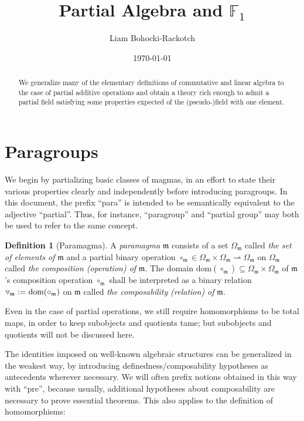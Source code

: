 \documentclass{article}
\title{\huge\bf Partial Algebra and \(\mathbb{F}_1\)}
\author{Liam Bohocki-Rackotch}
\date{\today}
\theoremstyle{definition}
\newtheorem{definition}{Definition}[section]
\newcommand{\tridown}{\mathbin{\hspace{.1em}\raisebox{.02em}{\rotatebox[origin=c]{90}{$\triangleleft$}}}}
\newcommand{\comp}{\tridown}
\newcommand{\pto}{\rightharpoonup}
\begin{document}
\maketitle

\begin{abstract}
We generalize many of the elementary definitions of commutative and linear algebra to the case of partial additive operations and obtain a theory rich enough to admit a partial field satisfying some properties expected of the (pseudo-)field with one element.
\end{abstract}

\tableofcontents

\section{Paragroups}

We begin by partializing basic classes of magmas, in an effort to state their various properties clearly and independently before introducing paragroups. In this document, the prefix ``para'' is intended to be semantically equivalent to the adjective ``partial''. Thus, for instance, ``paragroup'' and ``partial group'' may both be used to refer to the same concept.

\begin{definition}[Paramagma]
A \textit{paramagma} \(\mathfrak{m}\) consists of a set \(\Omega_\mathfrak{m}\) called \textit{the set of elements of} \(\mathfrak{m}\) and a partial binary operation \(\circ_\mathfrak{m}\in\Omega_\mathfrak{m}\times\Omega_\mathfrak{m}\pto\Omega_\mathfrak{m}\) on \(\Omega_\mathfrak{m}\) called \textit{the composition (operation) of} \(\mathfrak{m}\). The domain \(\text{dom}(\circ_\mathfrak{m})\subseteq\Omega_\mathfrak{m}\times\Omega_\mathfrak{m}\) of \(\mathfrak{m}\)'s composition operation \(\circ_\mathfrak{m}\) shall be interpreted as a binary relation \(\comp_\mathfrak{m}:=\text{dom}(\circ_\mathfrak{m})\) on \(\mathfrak{m}\) called \textit{the composability (relation) of} \(\mathfrak{m}\).
\end{definition}

Even in the case of partial operations, we still require homomorphisms to be total maps, in order to keep subobjects and quotients tame; but subobjects and quotients will not be discussed here.

The identities imposed on well-known algebraic structures can be generalized in the weakest way, by introducing definedness/composability hypotheses as antecedents wherever necessary. We will often prefix notions obtained in this way with ``pre'', because usually, additional hypotheses about composability are necessary to prove essential theorems. This also applies to the definition of homomorphisms:
\end{document}

